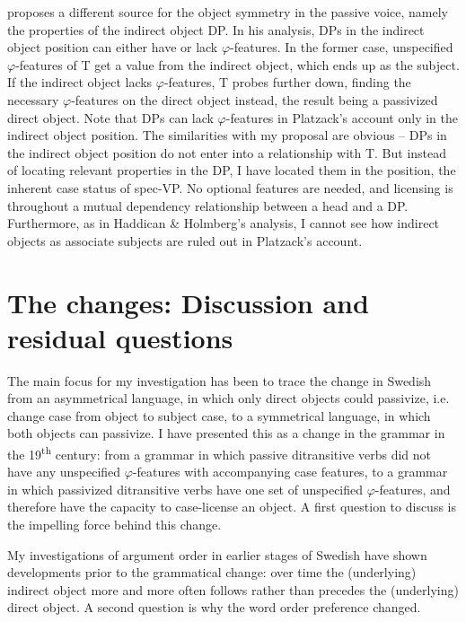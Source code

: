 \documentclass[output=paper]{langscibook}
\begin{document}
\citet{Platzack2005,Platzack2006} proposes a different source for the object symmetry in the passive voice, namely the properties of the indirect object DP. In his analysis, DPs in the indirect object position can either have or lack $\varphi ${}-features. In the former case, unspecified $\varphi ${}-features of T get a value from the indirect object, which ends up as the subject. If the indirect object lacks $\varphi ${}-features, T probes further down, finding the necessary $\varphi ${}-features on the direct object instead, the result being a passivized direct object. Note that DPs can lack $\varphi ${}-features in Platzack’s account only in the indirect object position. The similarities with my proposal are obvious – DPs in the indirect object position do not enter into a relationship with T. But instead of locating relevant properties in the DP, I have located them in the position, the inherent case status of spec-VP. No optional features are needed, and licensing is throughout a mutual dependency relationship between a head and a DP. Furthermore, as in Haddican \& Holmberg’s analysis, I cannot see how indirect objects as associate subjects are ruled out in Platzack’s account.


\section{The changes: Discussion and residual questions}\label{sec:falk:5}


The main focus for my investigation has been to trace the change in Swedish from an asymmetrical language, in which only direct objects could passivize, i.e. change case from object to subject case, to a symmetrical language, in which both objects can passivize. I have presented this as a change in the grammar in the 19\textsuperscript{th} century: from a grammar in which passive ditransitive verbs did not have any unspecified $\varphi ${}-features with accompanying case features, to a grammar in which passivized ditransitive verbs have one set of unspecified $\varphi ${}-features, and therefore have the capacity to case-license an object. A first question to discuss is the impelling force behind this change.


My investigations of argument order in earlier stages of Swedish have shown developments prior to the grammatical change: over time the (underlying) indirect object more and more often follows rather than precedes the (underlying) direct object. A second question is why the word order preference changed. 
\end{document}
